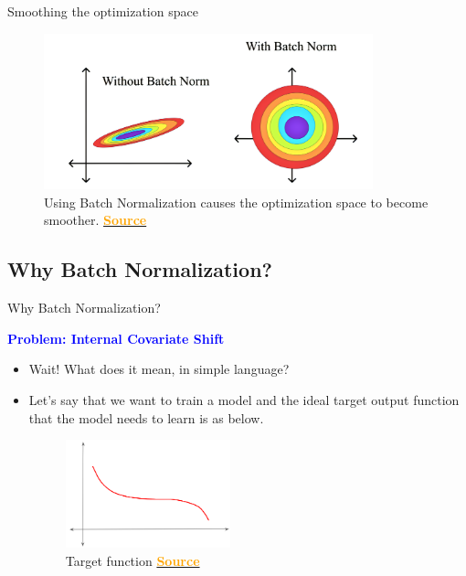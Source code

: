 \documentclass[serif, aspectratio=169]{beamer}
\begin{document}
\begin{frame}{Smoothing the optimization space}

        \begin{figure}
        \includegraphics[width=0.85\textwidth]{pic/BatchNorm_Effect.png}
        \caption{Using Batch Normalization causes the optimization space to become smoother. \href{https://www.linkedin.com/pulse/ways-improve-your-deep-learning-model-batch-adam-albuquerque-lima}{\textcolor{orange}{\textbf{Source}}}}
        \label{fig:BN_Effect1}
    \end{figure}

\end{frame}

\subsection{Why Batch Normalization?}

\begin{frame}{Why Batch Normalization?}

    \textcolor{blue}{\textbf{Problem: Internal Covariate Shift}}

\begin{itemize}

    \item Wait! What does it mean, in simple language?
    \item Let’s say that we want to train a model and the ideal target output function that the model needs to learn is as below.

    \begin{figure}
        \includegraphics[width=0.45\textwidth]{pic/ICS-1.png}
        \caption{Target function \href{https://ketanhdoshi.github.io/assets/images/BatchNorm/ICS-1.png}{\textcolor{orange}{\textbf{Source}}}}
        \label{fig:Target_function}
    \end{figure}

\end{itemize}

\end{frame}
\end{document}
